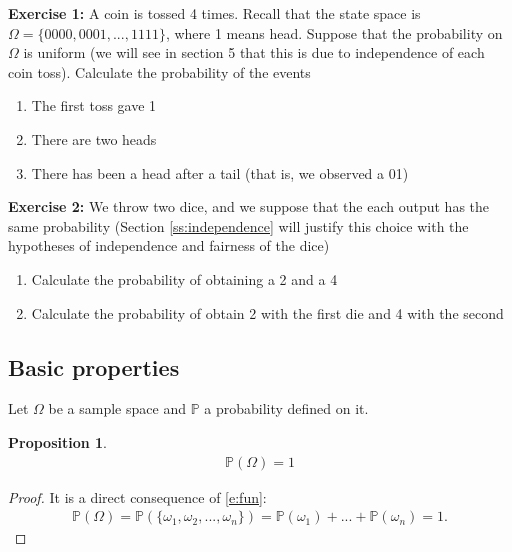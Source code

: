 \documentclass[12pt]{article}
\newtheorem{proposition}[theorem]{Proposition}
\newcommand{\<}{{\langle \!\! \langle}}
\renewcommand{\>}{{\rangle \!\! \rangle}}
\newcommand{\bel}[2]{\begin{equation} \label{#1} \begin{split} #2
 					\end{split} \end{equation}}
\begin{document}
\textbf{Exercise 1:} A coin is tossed 4 times. Recall that the state space is $\Omega=\{0000,0001,...,1111\}$, where 1 means head. Suppose that the probability on $\Omega$ is uniform (we will see in section 5 that this is due to independence of each coin toss). Calculate the probability of the events 
\begin{enumerate}
    \item The first toss gave 1 
    \item There are two heads 
    \item There has been a head after a tail (that is, we observed a 01)
    
\end{enumerate}

\textbf{Exercise 2:}
We throw two dice, and we suppose that the each output has the same probability (Section \ref{ss:independence} will justify this choice with the hypotheses of independence and fairness of the dice)
\begin{enumerate} 
    
    \item Calculate the probability of obtaining a 2 and a 4
    
    \item Calculate the probability of obtain 2 with the first die and 4 with the second 
\end{enumerate}


\subsection{Basic properties}
Let $\Omega$ be a sample space and $\mathbb{P}$ a probability defined on it. 
\begin{proposition}
\label{p1}
\bel{e:normalization}{\mathbb{P}(\Omega)=1}
\end{proposition}

\begin{proof}

	It is a direct consequence of \eqref{e:fun}:
	\bel{}{\mathbb{P}(\Omega)=\mathbb{P}(\{\omega_1,\omega_2,...,\omega_n\})=\mathbb{P}(\omega_1)+...+\mathbb{P}(\omega_n)=1.}

\end{proof}
\end{document}
